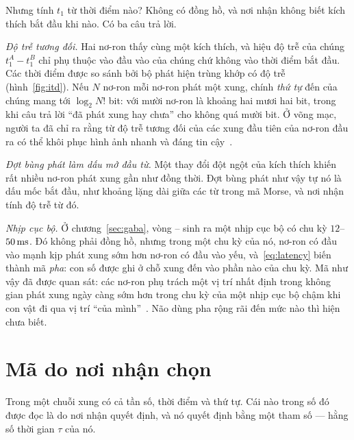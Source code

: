 Nhưng tính $t_1$ từ thời điểm nào? Không có đồng hồ, và nơi nhận không biết kích thích bắt đầu khi nào. Có ba câu trả lời.

\emph{Độ trễ tương đối.} Hai nơ-ron thấy cùng một kích thích, và hiệu độ trễ của chúng $t_1^A-t_1^B$ chỉ phụ thuộc vào đầu vào của chúng chứ không vào thời điểm bắt đầu. Các thời điểm được so sánh bởi bộ phát hiện trùng khớp có độ trễ (hình~\ref{fig:itd}). Nếu $N$ nơ-ron mỗi nơ-ron phát một xung, chính \emph{thứ tự} đến của chúng mang tới $\log_2N!$ bit: với mười nơ-ron là khoảng hai mươi hai bit, trong khi câu trả lời ``đã phát xung hay chưa'' cho không quá mười bit. Ở võng mạc, người ta đã chỉ ra rằng từ độ trễ tương đối của các xung đầu tiên của nơ-ron đầu ra có thể khôi phục hình ảnh nhanh và đáng tin cậy~\cite{Gollisch2008}.

\emph{Đợt bùng phát làm dấu mở đầu từ.} Một thay đổi đột ngột của kích thích khiến rất nhiều nơ-ron phát xung gần như đồng thời. Đợt bùng phát như vậy tự nó là dấu mốc bắt đầu, như khoảng lặng dài giữa các từ trong mã Morse, và nơi nhận tính độ trễ từ đó.

\emph{Nhịp cục bộ.} Ở chương~\ref{sec:gaba}, vòng -- sinh ra một nhịp cục bộ có chu kỳ $12$--$50\,\text{ms}$. Đó không phải đồng hồ, nhưng trong một chu kỳ của nó, nơ-ron có đầu vào mạnh kịp phát xung sớm hơn nơ-ron có đầu vào yếu, và~\eqref{eq:latency} biến thành mã \emph{pha}: con số được ghi ở chỗ xung đến vào phần nào của chu kỳ. Mã như vậy đã được quan sát: các nơ-ron phụ trách một vị trí nhất định trong không gian phát xung ngày càng sớm hơn trong chu kỳ của một nhịp cục bộ chậm khi con vật đi qua vị trí ``của mình''~\cite{OKeefe1993}. Não dùng pha rộng rãi đến mức nào thì hiện chưa biết.

\section{Mã do nơi nhận chọn}

Trong một chuỗi xung có cả tần số, thời điểm và thứ tự. Cái nào trong số đó được đọc là do nơi nhận quyết định, và nó quyết định bằng một tham số --- hằng số thời gian $\tau$ của nó.

